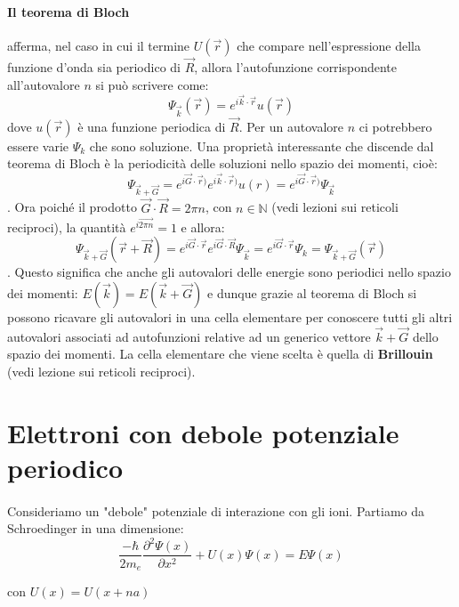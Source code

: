 \documentclass{book}
\begin{document}
        \paragraph{Il teorema di Bloch} afferma, nel caso in cui il termine $U(\vec{r})$ che compare nell'espressione della funzione d'onda sia periodico di $\vec{R}$, allora l'autofunzione corrispondente all'autovalore $n$ si può scrivere come:
        $$\Psi_{\vec{k}}(\vec{r}) = e^{i\vec{k}\cdot \vec{r}} u(\vec{r})$$
        dove $u(\vec{r})$ è una funzione periodica di $\vec{R}$. Per un autovalore $n$ ci potrebbero essere varie $\Psi_{k}$ che sono soluzione. \newline
        Una proprietà interessante che discende dal teorema di Bloch è la periodicità delle soluzioni nello spazio dei momenti, cioè:
        $$\Psi_{\vec{k}+\vec{G}} = e^{i\vec{G} \cdot \vec{r})}e^{i\vec{k} \cdot \vec{r})}u(r) = e^{i\vec{G} \cdot \vec{r})}\Psi_{\vec{k}}$$. Ora poiché il prodotto $\vec{G} \cdot \vec{R} = 2 \pi n$, con $n \in \mathbb{N}$ (vedi lezioni sui reticoli reciproci), la quantità $e^{i\vec{2 \pi n}} = 1$ e allora:
        $$\Psi_{\vec{k}+\vec{G}}(\vec{r}+\vec{R}) = e^{i\vec{G} \cdot \vec{r}}e^{i\vec{G} \cdot \vec{R}} \Psi_{\vec{k}} = e^{i\vec{G} \cdot \vec{r}}\Psi_{k} = \Psi_{\vec{k}+\vec{G}}(\vec{r})$$.
        Questo significa che anche gli autovalori delle energie sono periodici nello spazio dei momenti:
        $E(\vec{k}) = E(\vec{k}+\vec{G})$
        e dunque grazie al teorema di Bloch si possono ricavare gli autovalori in una cella elementare per conoscere tutti gli altri autovalori associati ad autofunzioni relative ad un generico vettore $\vec{k}+\vec{G}$ dello spazio dei momenti. \newline
        La cella elementare che viene scelta è quella di \textbf{Brillouin} (vedi lezione sui reticoli reciproci).


        \section{Elettroni con debole potenziale periodico}
            \paragraph{}
                Consideriamo un "debole" potenziale di interazione con gli ioni. Partiamo da Schroedinger in una dimensione:
                $$\frac{-\hbar}{2m_{e}} \frac{\partial  ^{2} \Psi (x)}{\partial x^{2}} + U(x)\Psi(x) = E\Psi (x)$$

                con $U(x) = U(x+na)$
\end{document}
